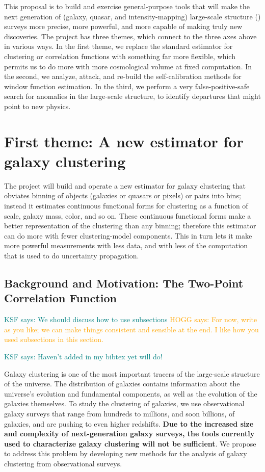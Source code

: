 \documentclass[12pt, fullpage, letterpaper]{article}
\newcommand{\KSF}[1]{\textcolor{teal}{KSF says: #1}}
\newcommand{\HOGG}[1]{\textcolor{orange}{HOGG says: #1}}
\begin{document}
This proposal is to build and exercise general-purpose tools that will
make the next generation of (galaxy, quasar, and intensity-mapping)
large-scale structure (\LSS) surveys more precise, more powerful, and
more capable of making truly new discoveries.
The project has three themes, which connect to the three axes above in
various ways.
In the first theme, we replace the standard estimator for clustering or
correlation functions with something far more flexible, which permits us
to do more with more cosmological volume at fixed computation.
In the second, we analyze, attack, and re-build the self-calibration 
methods for window function estimation.
In the third, we perform a very false-positive-safe search for anomalies
in the large-scale structure, to identify departures that might point to
new physics.

\section{First theme: A new estimator for galaxy clustering}

The project will build and operate a new estimator for
galaxy clustering that obviates binning of objects (galaxies or
quasars or pixels) or pairs into bins; instead it estimates continuous
functional forms for clustering as a function of scale, galaxy mass,
color, and so on.
These continuous functional forms make a better representation of the
clustering than any binning; therefore this estimator can do more with
fewer clustering-model components.
This in turn lets it make more powerful measurements with less data,
and with less of the computation that is used to do uncertainty
propagation.


\subsection{Background and Motivation: The Two-Point Correlation Function}

\KSF{We should discuss how to use subsections} \HOGG{For now, write as you like; we can make things consistent and sensible at the end. I like how you used subsections in this section.}

\KSF{Haven't added in my bibtex yet will do!}

Galaxy clustering is one of the most important tracers of the large-scale structure of the universe.
The distribution of galaxies contains information about the universe's evolution and fundamental components, as well as the evolution of the galaxies themselves.
To study the clustering of galaxies, we use observational galaxy surveys that range from hundreds to millions, and soon billions, of galaxies, and are pushing to even higher redshifts.
\textbf{Due to the increased size and complexity of next-generation galaxy surveys, the tools currently used to characterize galaxy clustering will not be sufficient}.
We propose to address this problem by developing new methods for the analysis of galaxy clustering from observational surveys.
\end{document}
